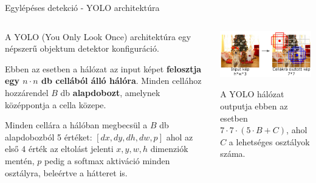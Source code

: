 \documentclass[english, aspectratio=169]{beamer}
\begin{document}
\begin{frame}{Egylépéses detekció - YOLO architektúra}
\begin{columns}
\begin{column}{.5\textwidth}
A YOLO (You Only Look Once) architektúra egy népszerű objektum detektor konfiguráció.\par\smallskip
Ebben az esetben a hálózat az input képet \textbf{felosztja egy $n \cdot n$ db cellából álló hálóra}. Minden cellához hozzárendel $B$ db \textbf{alapdobozt}, amelynek középpontja a cella közepe.\par\smallskip
Minden cellára a hálóban megbecsül a $B$ db alapdobozból 5 értéket: $[dx, dy, dh, dw, p]$ ahol az első $4$ érték az eltolást jelenti $x, y, w, h$ dimenziók mentén, $p$ pedig a softmax aktiváció minden osztályra, beleértve a hátteret is. 
\end{column}
\begin{column}{.5\textwidth}
\begin{center}
\includegraphics[width=7cm, keepaspectratio]{images/od_19.png}
\end{center}
A YOLO hálózat outputja ebben az esetben $7 \cdot 7 \cdot (5 \cdot B + C)$, ahol $C$ a lehetséges osztályok száma.
\end{column}
\end{columns}
\end{frame}
\end{document}
